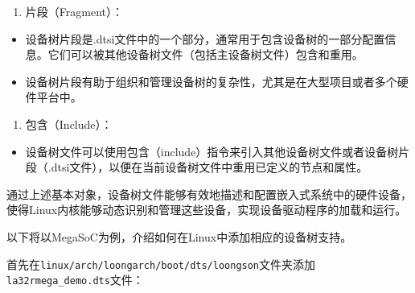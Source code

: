 \begin{enumerate}
\def\labelenumi{\arabic{enumi}.}
\setcounter{enumi}{3}
\tightlist
\item
  片段（Fragment）：
\end{enumerate}

\begin{itemize}
\item
  设备树片段是.dtsi文件中的一个部分，通常用于包含设备树的一部分配置信息。它们可以被其他设备树文件（包括主设备树文件）包含和重用。
\item
  设备树片段有助于组织和管理设备树的复杂性，尤其是在大型项目或者多个硬件平台中。
\end{itemize}

\begin{enumerate}
\def\labelenumi{\arabic{enumi}.}
\setcounter{enumi}{4}
\tightlist
\item
  包含（Include）：
\end{enumerate}

\begin{itemize}
\tightlist
\item
  设备树文件可以使用包含（include）指令来引入其他设备树文件或者设备树片段（.dtsi文件），以便在当前设备树文件中重用已定义的节点和属性。
\end{itemize}

通过上述基本对象，设备树文件能够有效地描述和配置嵌入式系统中的硬件设备，使得Linux内核能够动态识别和管理这些设备，实现设备驱动程序的加载和运行。

以下将以MegaSoC为例，介绍如何在Linux中添加相应的设备树支持。

首先在\texttt{linux/arch/loongarch/boot/dts/loongson}文件夹添加\texttt{la32rmega\_demo.dts}文件：

